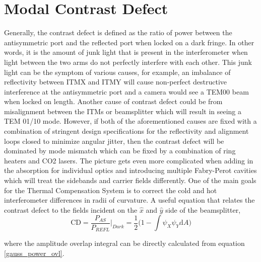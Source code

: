 	\section{Modal Contrast Defect}
	Generally, the contrast defect is defined as the ratio of power between the antisymmetric port and the reflected port when locked on a dark fringe.  
	In other words, it is the amount of junk light that is present in the interferometer when light between the two arms do not perfectly interfere with each other. 
	This junk light can be the symptom of various causes, for example, an imbalance of reflectivity between ITMX and ITMY will cause non-perfect destructive interference at the antisymmetric port and a camera would see a TEM00 beam when locked on length.  
	Another cause of contrast defect could be from misalignment between the ITMs or beamsplitter which will result in seeing a TEM 01/10 mode.  
	However, if both of the aforementioned causes are fixed with a combination of stringent design specifications for the reflectivity and alignment loops closed to minimize angular jitter, then the contrast defect will be dominated by mode mismatch which can be fixed by a combination of ring heaters and CO2 lasers.   
	The picture gets even more complicated when adding in the absorption for individual optics and introducing multiple Fabry-Perot cavities which will treat the sidebands and carrier fields differently.  
	One of the main goals for the Thermal Compensation System is to correct the cold and hot interferometer differences in radii of curvature.  
	A useful equation that relates the contrast defect to the fields incident on the $\hat{x}$ and $\hat{y}$ side of the beamsplitter,
	\begin{equation}\label{CD}
	\text{CD} = \frac{P_{AS}}{P_{REFL}} \bigg\vert_{Dark} = \frac{1}{2} \bigg( 1 - \int \psi_X \psi_Y \text{d}A\bigg)
	\end{equation}
	
	where the amplitude overlap integral can be directly calculated from equation \ref{gauss_power_ovl}.  
	
